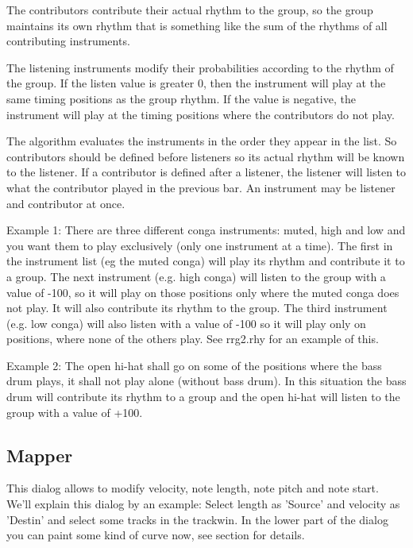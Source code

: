 \documentclass[letterpaper]{report}
\begin{document}
The contributors contribute their actual rhythm to the group, so the group
maintains its own rhythm that is something like the sum of the rhythms of
all contributing instruments.

The listening instruments modify their probabilities according to the
rhythm of the group. If the listen value is greater 0, then the instrument
will play at the same timing positions as the group rhythm. If the value
is negative, the instrument will play at the timing positions where the
contributors do not play.

The algorithm evaluates the instruments in the order they appear in the
list. So contributors should be defined before listeners so its actual rhythm
will be known to the listener. If a contributor is
defined after a listener, the listener will listen to what the contributor
played in the previous bar. An instrument may be listener and contributor
at once.

Example 1: There are three different conga instruments: muted,  high and low
and you want them to play exclusively (only one instrument at a time). The
first in the instrument list (eg the muted conga) will play its rhythm and
contribute it to a group. The next instrument (e.g. high conga) will listen
to the group with a value of -100, so it will play on those positions only
where the muted conga does not play. It will also contribute its
rhythm to the group. The third instrument (e.g. low conga) will also listen
with a value of -100 so it will play only on positions, where none of the
others play. See rrg2.rhy for an example of this.

Example 2: The open hi-hat shall go on some of the positions where the
bass drum plays, it shall not play alone (without bass drum). In this
situation the bass drum will contribute its rhythm to a group and the
open hi-hat will listen to the group with a value of +100.



\subsection{Mapper}\label{mapper}

This dialog allows to modify velocity, note length, note pitch and note start.
We'll explain this dialog by an example: Select length as 'Source' and velocity
as 'Destin' and select some tracks in the trackwin. In the lower part of the
dialog you can paint some kind of curve now, see section  for details.
\end{document}
